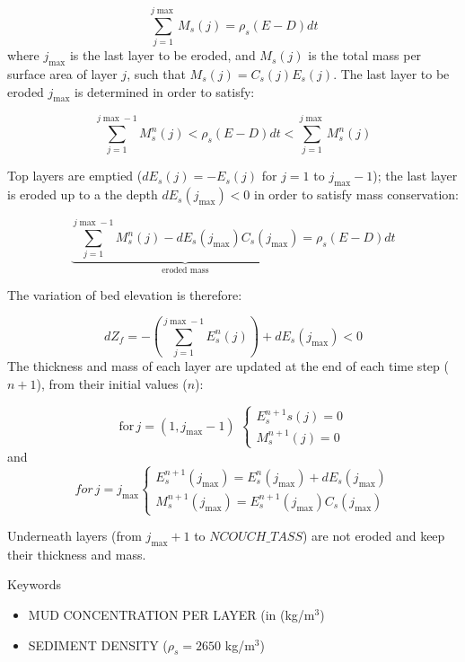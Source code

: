 \begin{equation*}
\sum_{j=1}^{j\max} M_s(j) = \rho_s(E-D) dt 
\end{equation*}
where $j_{\max}$ is the last layer to be eroded, and $M_s(j)$ is the total mass per surface area of
layer $j$, such that $M_s(j) = C_s(j) E_s(j)$. The last layer to be eroded $j_{\max}$ is determined in order to satisfy:

\begin{equation*}
\sum_{j=1}^{j\max-1} M_s^{n}(j) < \rho_s(E-D)dt < \sum_{j=1}^{j\max} M_s^n(j)
\end{equation*}

Top layers are emptied ($dE_s(j) =-E_s(j)$ for $j=1$ to $j_{\max}-1$); the
last layer is eroded up to a the depth $dE_s(j_{\max}) < 0$ in order to
satisfy mass conservation:

\begin{equation*}
\underbrace{\sum_{j=1}^{j\max-1} M_s^n(j) - dE_s(j_{\max})C_s(j_{\max})}_{\text{eroded mass}} = \rho_s (E-D) dt 
\end{equation*}

The variation of bed elevation is therefore:

\begin{equation*}
dZ_f =-\left(\sum_{j=1}^{j\max-1} E_s^n(j)\right) + dE_s(j_{\max}) < 0 
\end{equation*}
The thickness and mass of each layer are updated at the end of each time
step ($n+1$), from their initial values ($n$):

\begin{equation*}
\text{for}\,j=(1,j_{\max}-1)\,\,\left\{ 
\begin{array}{l}
E_s^{n+1} s(j) = 0 \\ 
M_s^{n+1}(j)=0
\end{array}
\right. 
\end{equation*}
and
\begin{equation*}
for\,j=j_{\max} \left\{ 
\begin{array}{l}
E_s^{n+1} (j_{\max}) = E_s^n(j_{\max}) + dE_s(j_{\max}) \\ 
M_s^{n+1} (j_{\max}) = E_s^{n+1}(j_{\max}) C_s(j_{\max})
\end{array}
\right.
\end{equation*}

Underneath layers (from $j_{\max} + 1$ to $NCOUCH\_TASS$) are not eroded and keep
their thickness and mass.

\medskip
\begin{bclogo}[couleur=blue!10,arrondi=0.1, logo=\bcinfo]{Keywords}
\begin{itemize}
\item {\ttfamily MUD CONCENTRATION PER LAYER} (in (kg/m$^3$)
\item {\ttfamily SEDIMENT DENSITY} ($\rho_s = 2650$ kg/m$^3$)
\end{itemize}
\end{bclogo}

